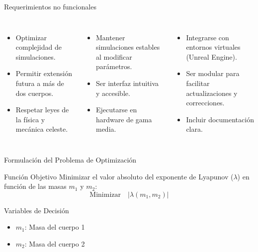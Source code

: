 \begin{frame}{Requerimientos no funcionales}
  \begin{columns}[T]
      \begin{itemize}
        \item Optimizar complejidad de simulaciones.
        \item Permitir extensión futura a más de dos cuerpos.
        \item Respetar leyes de la física y mecánica celeste.
      \end{itemize}
      \begin{itemize}
        \item Mantener simulaciones estables al modificar parámetros.
        \item Ser interfaz intuitiva y accesible.
        \item Ejecutarse en hardware de gama media.
      \end{itemize}
      \begin{itemize}
        \item Integrarse con entornos virtuales (Unreal Engine).
        \item Ser modular para facilitar actualizaciones y correcciones.
        \item Incluir documentación clara.
      \end{itemize}
  \end{columns}
\end{frame}

\begin{frame}{Formulación del Problema de Optimización}

\begin{block}{Función Objetivo}
  Minimizar el valor absoluto del exponente de Lyapunov ($\lambda$) en función de las masas $m_1$ y $m_2$:
  $$ \text{Minimizar} \quad |\lambda(m_1, m_2)| $$
\end{block}

\begin{block}{Variables de Decisión}
  \begin{itemize}
      \item $m_1$: Masa del cuerpo 1
      \item $m_2$: Masa del cuerpo 2
  \end{itemize}
\end{block}
\end{frame}


